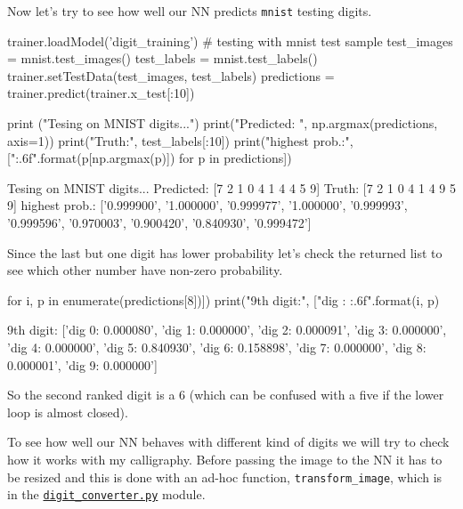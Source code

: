 Now let's try to see how well our NN predicts \texttt{mnist} testing
digits.

\begin{ipython}
trainer.loadModel('digit_training')
# testing with mnist test sample
test_images = mnist.test_images()
test_labels = mnist.test_labels()
trainer.setTestData(test_images, test_labels)
predictions = trainer.predict(trainer.x_test[:10])

print ("Tesing on MNIST digits...")
print("Predicted: ", np.argmax(predictions, axis=1))
print("Truth:", test_labels[:10])
print("highest prob.:", ["{:.6f}".format(p[np.argmax(p)]) for p in predictions])
\end{ipython}
\begin{ioutput}
Tesing on MNIST digits...
Predicted:  [7 2 1 0 4 1 4 4 5 9]
Truth: [7 2 1 0 4 1 4 9 5 9]
highest prob.: ['0.999900', '1.000000', '0.999977', '1.000000', '0.999993',
'0.999596', '0.970003', '0.900420', '0.840930', '0.999472']
\end{ioutput}

Since the last but one digit has lower probability let's check the
returned list to see which other number have non-zero probability.

\begin{ipython}
for i, p in enumerate(predictions[8])])
    print("9th digit:", ["dig {}: {:.6f}".format(i, p)
\end{ipython}
\begin{ioutput}
9th digit: ['dig 0: 0.000080', 'dig 1: 0.000000', 'dig 2: 0.000091', 'dig 3:
0.000000', 'dig 4: 0.000000', 'dig 5: 0.840930', 'dig 6: 0.158898', 'dig 7:
0.000000', 'dig 8: 0.000001', 'dig 9: 0.000000']
\end{ioutput}

So the second ranked digit is a 6 (which can be confused with a five if
the lower loop is almost closed).

To see how well our NN behaves with different kind of digits we will try
to check how it works with my calligraphy.
Before passing the image to the NN it has to be resized and this is done
with an ad-hoc function, \texttt{transform\_image}, which is in the
\href{https://raw.githubusercontent.com/matteosan1/finance_course/develop/libro/input_files/digit_converter.py}{\texttt{digit\_converter.py}} module.

